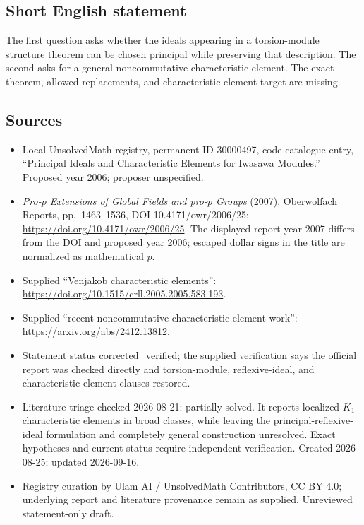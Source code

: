 \documentclass[11pt]{article}
\begin{document}
\subsection{Short English statement}
The first question asks whether the ideals appearing in a torsion-module structure theorem can be chosen principal while preserving that description. The second asks for a general noncommutative characteristic element. The exact theorem, allowed replacements, and characteristic-element target are missing.
\subsection{Sources}
\begin{itemize}
\item Local UnsolvedMath registry, permanent ID 30000497, code catalogue entry, ``Principal Ideals and Characteristic Elements for Iwasawa Modules.'' Proposed year 2006; proposer unspecified.
\item \emph{Pro-$p$ Extensions of Global Fields and pro-$p$ Groups} (2007), Oberwolfach Reports, pp.\ 1463--1536, DOI 10.4171/owr/2006/25; \url{https://doi.org/10.4171/owr/2006/25}. The displayed report year 2007 differs from the DOI and proposed year 2006; escaped dollar signs in the title are normalized as mathematical $p$.
\item Supplied ``Venjakob characteristic elements'': \url{https://doi.org/10.1515/crll.2005.2005.583.193}.
\item Supplied ``recent noncommutative characteristic-element work'': \url{https://arxiv.org/abs/2412.13812}.
\item Statement status corrected\_verified; the supplied verification says the official report was checked directly and torsion-module, reflexive-ideal, and characteristic-element clauses restored.
\item Literature triage checked 2026-08-21: partially solved. It reports localized $K_1$ characteristic elements in broad classes, while leaving the principal-reflexive-ideal formulation and completely general construction unresolved. Exact hypotheses and current status require independent verification. Created 2026-08-25; updated 2026-09-16.
\item Registry curation by Ulam AI / UnsolvedMath Contributors, CC BY 4.0; underlying report and literature provenance remain as supplied. Unreviewed statement-only draft.
\end{itemize}
\end{document}
